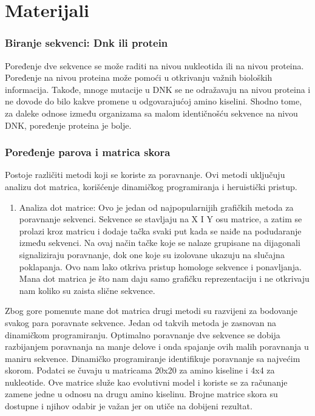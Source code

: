 \chapter{Materijali}

\subsection{Biranje sekvenci: Dnk ili protein}
Poređenje dve sekvence se može raditi na nivou nukleotida ili na nivou proteina. Poređenje na nivou proteina može pomoći u otkrivanju važnih bioloških informacija. Takođe, mnoge mutacije u DNK se ne odražavaju na nivou proteina i ne dovode do bilo kakve promene u odgovarajućoj amino kiselini. Shodno tome, za daleke odnose između organizama sa malom identičnošću sekvence na nivou DNK, poređenje proteina je bolje.


\subsection{Poređenje parova i matrica skora}
Postoje različiti metodi koji se koriste za poravnanje. Ovi metodi uključuju analizu dot matrica, korišćenje dinamičkog programiranja i heruistički pristup.

\begin{enumerate}
\item Analiza dot matrice: Ovo je jedan od najpopularnijih grafičkih metoda za poravnanje sekvenci. Sekvence se stavljaju na X I Y osu matrice, a zatim se prolazi kroz matricu i dodaje tačka svaki put kada se naiđe na podudaranje između sekvenci. Na ovaj način tačke koje se nalaze grupisane na dijagonali signaliziraju poravnanje, dok one koje su izolovane ukazuju na slučajna poklapanja. Ovo nam lako otkriva pristup homologe sekvence i ponavljanja. Mana dot matrica je što nam daju samo grafičku reprezentaciju i ne otkrivaju nam koliko su zaista slične sekvence.
\end{enumerate} \vspace{5mm}

Zbog gore pomenute mane dot matrica drugi metodi su razvijeni za bodovanje svakog para poravnate sekvence. Jedan od takvih metoda je zasnovan na dinamičkom programiranju. Optimalno poravnanje dve sekvence se dobija razbijanjem poravnanja na manje delove i onda spajanje ovih malih poravnanja u maniru sekvence. Dinamičko programiranje identifikuje poravnanje sa najvećim skorom. Podatci se čuvaju u matricama 20x20 za amino kiseline i 4x4 za nukleotide. Ove matrice služe kao evolutivni model i koriste se za računanje zamene jedne u odnosu na drugu amino kiselinu. Brojne matrice skora su dostupne i njihov odabir je važan jer on utiče na dobijeni rezultat.

